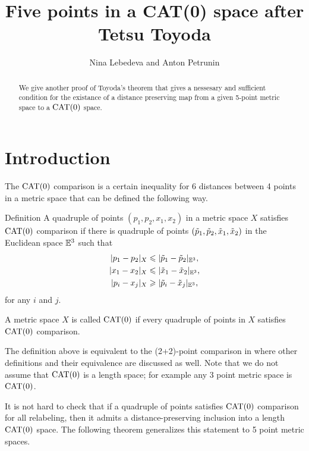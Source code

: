 \documentclass{article}
\begin{document}
\title{Five points in a CAT(0) space after  Tetsu Toyoda}
\author{Nina Lebedeva and Anton Petrunin}
\date{}
\maketitle
\begin{abstract}
We give another proof of Toyoda's theorem that gives a nessesary and sufficient condition for the existance of a distance preserving map from a given 5-point metric space to a $\CAT(0)$ space. 
\end{abstract}

\section{Introduction}

The $\CAT(0)$ comparison is a certain inequality for 6 distances between 4 points in a metric space 
that can be defined the following way.

\begin{thm}{Definition}
A quadruple of points $(p_1,p_2,x_1,x_2)$ in a metric space $X$ satisfies $\CAT(0)$ comparison
if there is quadruple of points $(\~p_1,\~p_2,\~x_1,\~x_2)$ in the Euclidean space $\EE^3$ such that 
\begin{align*}
|p_1-p_2|_{X}&\le|\~p_1-\~p_2|_{\EE^3},
\\ 
|x_1-x_2|_{X}&\le|\~x_1-\~x_2|_{\EE^3},
\\ 
|p_i-x_j|_{X}&\ge|\~p_i-\~x_j|_{\EE^3},
\end{align*}
for any $i$ and $j$.

A metric space $X$ is called $\CAT(0)$ if every quadruple of points in $X$ satisfies $\CAT(0)$ comparison.
\end{thm}

The definition above is equivalent to the (2+2)-point comparison in \cite{alexander-kapovitch-petrunin}
where other definitions and their equivalence are discussed as well.
Note that we do not assume that $\CAT(0)$ is a length space;
for example any 3 point metric space is $\CAT(0)$.


It is not hard to check that if a quadruple of points satisfies $\CAT(0)$ comparison for all relabeling,
then it admits a distance-preserving inclusion into a length $\CAT(0)$ space.
The following theorem generalizes this statement to 5 point metric spaces.
\end{document}
